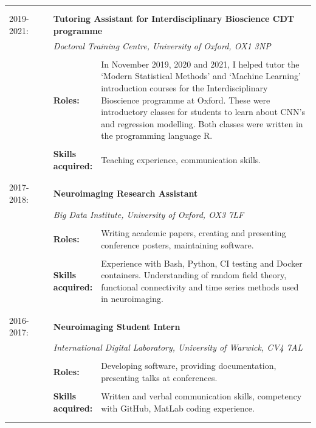 \documentclass{friggeri-cv}
\begin{document}
\begin{longtable}{p{0.15\linewidth} p{0.1\linewidth} p{0.75\linewidth}}
     & \\
     & \\
      2019-2021: & \multicolumn{2}{p{0.85\linewidth}}{\textbf{Tutoring Assistant for Interdisciplinary Bioscience CDT programme}} \\
     & \multicolumn{2}{p{0.85\linewidth}}{\textit{Doctoral Training Centre, University of Oxford,  OX1 3NP}} \\
     & \\
     & \textbf{Roles:} & In November 2019, 2020 and 2021, I helped tutor the ‘Modern Statistical Methods’ and ‘Machine Learning’ introduction courses for the Interdisciplinary Bioscience programme at Oxford. These were introductory classes for students to learn about CNN’s and regression modelling. Both classes were written in the programming language R.\\
     & \\
     & \textbf{Skills acquired:} & Teaching experience, communication skills. \\
     & \\
     & \\
      2017-2018: & \multicolumn{2}{p{0.85\linewidth}}{\textbf{Neuroimaging Research Assistant}} \\
     & \multicolumn{2}{p{0.85\linewidth}}{\textit{Big Data Institute, University of Oxford, OX3 7LF}} \\
     & \\
     & \textbf{Roles:} & Writing academic papers, creating and presenting conference posters, maintaining software.\\
     & \\
     & \textbf{Skills acquired:} & Experience with Bash, Python, CI testing and Docker containers. Understanding of random field theory, functional connectivity and time series methods used in neuroimaging. \\
     & \\
     & \\
      2016-2017: & \multicolumn{2}{p{0.85\linewidth}}{\textbf{Neuroimaging Student Intern}} \\
     & \multicolumn{2}{p{0.85\linewidth}}{\textit{International Digital Laboratory, University of Warwick, CV4 7AL}} \\
     & \\
     & \textbf{Roles:} & Developing software, providing documentation, presenting talks at conferences.\\
     & \\
     & \textbf{Skills acquired:} & Written and verbal communication skills, competency with GitHub, MatLab coding experience. \\
     & \\
     & \\
     
\end{longtable}
\end{document}

